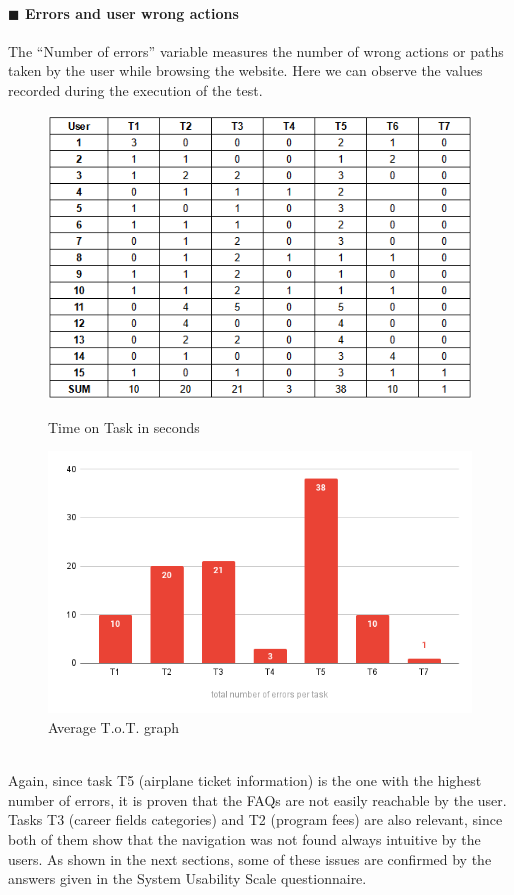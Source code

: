 \documentclass[11pt]{article} %
\begin{document}
\paragraph{$\blacksquare$ Errors and user wrong actions}
The “Number of errors” variable measures the number of wrong actions or paths taken by the user while browsing the website. Here we can observe the values recorded during the execution of the test.
\begin{figure}[ht]
  \centering
  \begin{minipage}[b]{0.48\textwidth}
    \includegraphics[width=\textwidth]{Images/table3.png}
    \caption{Time on Task in seconds}
  \end{minipage}
  \hfill
  \begin{minipage}[b]{0.48\textwidth}
    \includegraphics[width=\textwidth]{Images/errors.png}
    \caption{Average T.o.T. graph}
  \end{minipage}
\end{figure}\\
Again, since task T5 (airplane ticket information) is the one with the highest number of errors, it is proven that the FAQs are not easily reachable by the user.
Tasks T3 (career fields categories) and T2 (program fees) are also relevant, since both of them show that the navigation was not found always intuitive by the users.  
As shown in the next sections, some of these issues are confirmed by the answers given in the System Usability Scale questionnaire.
\end{document}
